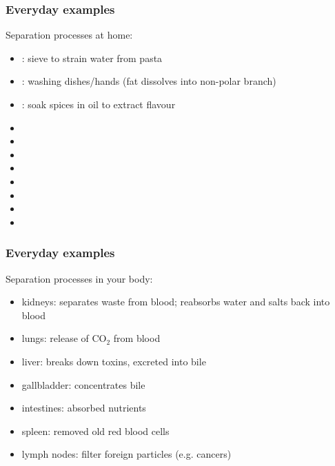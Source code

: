 \begin{frame}\frametitle{Everyday examples}
	Separation processes at home:
	\begin{itemize}
		\item	{\color{myGreen}{screening}}: sieve to strain water from pasta
		\item	{\color{myGreen}{absorption}}: washing dishes/hands (fat dissolves into non-polar branch)
		\item	{\color{myGreen}{liquid/liquid extraction}}: soak spices in oil to extract flavour 
		\item	\iftoggle{instructor}{\href{https://www.youtube.com/watch?v=uQTGKLbh9X4}{{\color{myGreen}{cyclone:}} vacuum cleaner}}{\href{https://www.youtube.com/watch?v=uQTGKLbh9X4}{cyclone:}}
		\item	\iftoggle{instructor}{{\color{myGreen}{filtering}}: vacuum cleaner; furnace filter}{{\color{myGreen}{filter}}:}		
		\item	\iftoggle{instructor}{{\color{myGreen}{leaching}}: coffee/espresso maker}{{\color{myGreen}{leaching}}:}
		\item	\iftoggle{instructor}{{\color{myGreen}{leaching}}: making tea}{{\color{myGreen}{leaching}}:}
		\item	\iftoggle{instructor}{{\color{myGreen}{adsorption}}: water filter}{{\color{myGreen}{adsorption}}:}
		\item	\iftoggle{instructor}{{\color{myGreen}{centrifugation}}: clothes washing machine}{{\color{myGreen}{centrifugation}}:}
		\item	\iftoggle{instructor}{{\color{myGreen}{phase change by heat addition}}: clothes drier}{{\color{myGreen}{phase change by heat addition}}:}
		\item	\iftoggle{instructor}{{\color{myGreen}{phase change by heat removal}}: dehumidifier}{{\color{myGreen}{phase change by heat removal}}:}
	\end{itemize}
\end{frame}
	
\begin{frame}\frametitle{Everyday examples}
	Separation processes in your body:
	\begin{itemize}
		\item	kidneys: separates waste from blood; reabsorbs water and salts back into blood
		\item	lungs: release of $\text{CO}_2$ from blood
		\item	liver: breaks down toxins, excreted into bile
		\item	gallbladder: concentrates bile
		\item	intestines: absorbed nutrients
		\item	spleen: removed old red blood cells
		\item	lymph nodes: filter foreign particles (e.g. cancers)
	\end{itemize}
\end{frame}

